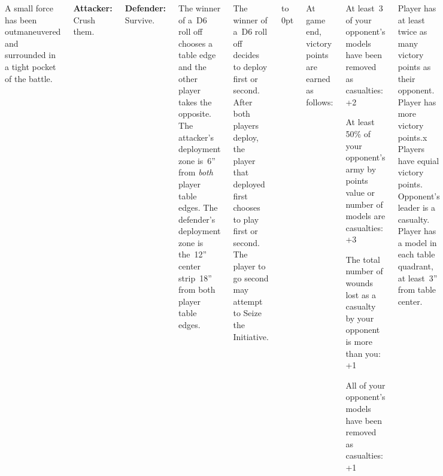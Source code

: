 
\begin{columns}

  A small force has been outmaneuvered and surrounded in a tight
  pocket of the battle.

{\bf Attacker:} Crush them.

{\bf Defender:} Survive.

%

The winner of a~D6 roll off chooses a table edge and the other player
takes the opposite.  The attacker's deployment zone is~6'' from
\emph{both} player table edges.  The defender's deployment zone is
the~12'' center strip~18'' from both player table edges.


%

The winner of a~D6 roll off decides to deploy first or second.  After
both players deploy, the player that deployed first chooses to play
first or second.  The player to go second may attempt to Seize the
Initiative.

\vfill
\vbox to 0pt{}

\columnbreak
At game end, victory points are earned as follows:

\begin{squishitemize}
\item At least~3 of your opponent's models have been removed as
  casualties: +2

\item At least 50\% of your opponent's army by points value or number
  of models are casualties: +3

\item The total number of wounds lost as a casualty by your opponent
  is more than you: +1

\item All of your opponent's models have been removed as casualties:
  +1
\end{squishitemize}

\vspace*{-2pt}

\scoringbox%
{Player has at least twice as many victory points as their opponent.}%
{Player has more victory points.x}%
{Players have equial victory points.}%
{Opponent's leader is a casualty.}%
{Player has a model in each table quadrant, at least~3'' from table center.}

\end{columns}
